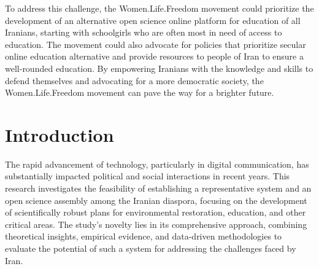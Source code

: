 \documentclass{IEEEtran}
\begin{document}
To address this challenge, the Women.Life.Freedom movement could prioritize the development of an alternative open science online platform for education of all Iranians, starting with schoolgirls who are often most in need of access to education. The movement could also advocate for policies that prioritize secular online education alternative and provide resources to people of Iran to ensure a well-rounded education.
By empowering Iranians with the knowledge and skills to defend themselves and advocating for a more democratic society, the Women.Life.Freedom movement can pave the way for a brighter future.









\section{Introduction}

The rapid advancement of technology, particularly in digital communication, has substantially impacted political and social interactions in recent years. This research investigates the feasibility of establishing a representative system and an open science assembly among the Iranian diaspora, focusing on the development of scientifically robust plans for environmental restoration, education, and other critical areas. The study's novelty lies in its comprehensive approach, combining theoretical insights, empirical evidence, and data-driven methodologies to evaluate the potential of such a system for addressing the challenges faced by Iran.
\end{document}
